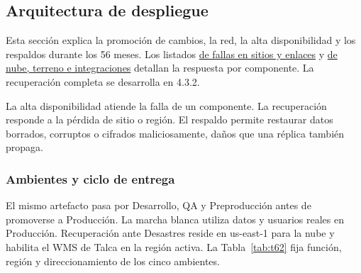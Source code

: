 %

\providecommand{\minititulo}[1]{\par\addvspace{8pt}\noindent{\intersemibold\color{lafroxTinta}#1}\par\nopagebreak\addvspace{2pt}}

\subsection{Arquitectura de despliegue}
\label{fuente-11-j-despliegue}
\label{sec:despliegue}

Esta sección explica la promoción de cambios, la red, la alta disponibilidad y los respaldos durante los 56 meses. Los listados \hyperref[tab:fallas-sitios]{de fallas en sitios y enlaces} y \hyperref[tab:fallas-nube]{de nube, terreno e integraciones} detallan la respuesta por componente. La recuperación completa se desarrolla en 4.3.2.

La alta disponibilidad atiende la falla de un componente. La recuperación responde a la pérdida de sitio o región. El respaldo permite restaurar datos borrados, corruptos o cifrados maliciosamente, daños que una réplica también propaga.

\subsubsection{Ambientes y ciclo de entrega}
\label{sub:1-ambientes-de-despliegue-rt-04-01}

El mismo artefacto pasa por Desarrollo, QA y Preproducción antes de promoverse a Producción. La marcha blanca utiliza datos y usuarios reales en Producción. Recuperación ante Desastres reside en us-east-1 para la nube y habilita el WMS de Talca en la región activa. La Tabla~\ref{tab:t62} fija función, región y direccionamiento de los cinco ambientes.

